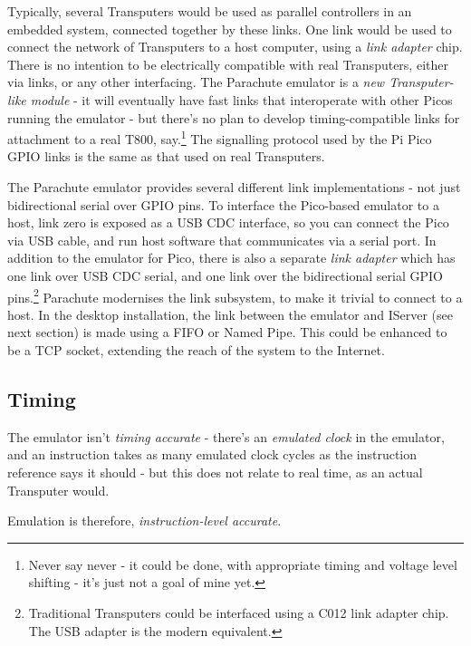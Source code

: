 \documentclass[a4paper]{tufte-book}
\begin{document}
Typically, several Transputers would be used as parallel controllers in an embedded system, connected together by these links. One link would be used to connect the network of Transputers to a host computer, using a  \textit{link adapter} chip.  There is no intention to be electrically compatible with real Transputers, either via links, or any other interfacing. The Parachute emulator is a \textit{new Transputer-like module} - it will eventually have fast links that interoperate with other Picos running the emulator - but there's no plan to develop timing-compatible links for attachment to a real T800, say.\footnote{Never say never - it could be done, with appropriate timing and voltage level shifting - it's just not a goal of mine yet.} The signalling protocol used by the Pi Pico GPIO links is the same as that used on real Transputers.

The Parachute emulator provides several different link implementations - not just bidirectional serial over GPIO pins. To interface the Pico-based emulator to a host, link zero is exposed as a USB CDC interface, so you can connect the Pico via USB cable, and run host software that communicates via a serial port. In addition to the emulator for Pico, there is also a separate \textit{link adapter} which has one link over USB CDC serial, and one link over the bidirectional serial GPIO pins.\footnote{Traditional Transputers could be interfaced using a C012 link adapter chip. The USB adapter is the modern equivalent.} Parachute modernises the link subsystem, to make it trivial to connect to a host. In the desktop installation, the link between the emulator and IServer (see next section) is made using a FIFO or Named Pipe. This could be enhanced to be a TCP socket, extending the reach of the system to the Internet.

\subsection{Timing}
The emulator isn't \textit{timing accurate} - there's an \textit{emulated clock} in the emulator, and an instruction takes as many emulated clock cycles as the instruction reference says it should - but this does not relate to real time, as an actual Transputer would.

Emulation is therefore, \textit{instruction-level accurate}. 

\end{document}
